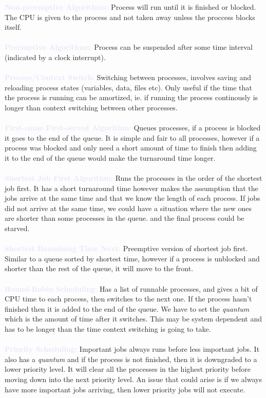 \documentclass[a4paper,10pt]{article}
\begin{document}
\newpage
\noindent \textcolor{Lavender}{\textbf{Non-preemptive Algorithms:}} Process will run until it is finished or blocked. The CPU is given to the process and not taken away unless the proccess blocks itself. \\\\
\textcolor{Lavender}{\textbf{Preemptive Algorithms:}} Process can be suspended after some time interval (indicated by a clock interrupt). \\\\
\textcolor{Lavender}{\textbf{Process/Context Switch:}} Switching between processes, involves saving and reloading process states (variables, data, files etc). Only useful if the time that the process is running can be amortized, ie. if running the process continously is longer than context switching between other processes. \\\\
\textcolor{Lavender}{\textbf{First-come First-served Algorithm:}} Queues processes, if a process is blocked it goes to the end of the queue. It is simple and fair to all processes, however if a process was blocked and only need a short amount of time to finish then adding it to the end of the queue would make the turnaround time longer. \\\\
\textcolor{Lavender}{\textbf{Shortest Job First Algorithm:}} Runs the processes in the order of the shortest job first. It has a short turnaround time however makes the assumption that the jobs arrive at the same time and that we know the length of each process. If jobs did not arrive at the same time, we could have a situation where the new ones are shorter than some processes in the queue. and the final process could be starved. \\\\
\textcolor{Lavender}{\textbf{Shortest Remaining Time Next:}} Preemptive version of shortest job first. Similar to a queue sorted by shortest time, however if a process is unblocked and shorter than the rest of the queue, it will move to the front. \\\\
\textcolor{Lavender}{\textbf{Round-Robin Scheduling:}} Has a list of runnable processes, and gives a bit of CPU time to each process, then switches to the next one. If the process hasn't finished then it is added to the end of the queue. We have to set the \textit{quantum} which is the amount of time after it switches. This may be system dependent and has to be longer than the time context switching is going to take. \\\\ 
\textcolor{Lavender}{\textbf{Priority Scheduling:}} Important jobs always runs before less important jobs. It also has a \textit{quantum} and if the process is not finished, then it is downgraded to a lower priority level. It will clear all the processes in the highest priority before moving down into the next priority level. An issue that could arise is if we always have more important jobs arriving, then lower priority jobs will not execute.
\end{document}
